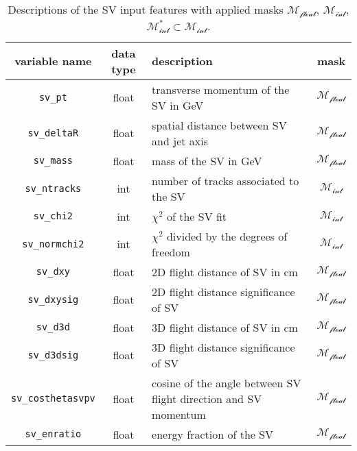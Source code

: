 \begin{table}[h]
\centering
\caption{Descriptions of the SV input features with applied masks $\mathcal{M_{\text{float}}}$, $\mathcal{M_{\text{int}}}$, $\mathcal{M_{\text{int}}^*\subset M_{\text{int}}}$.}
\begin{tabularx}{\textwidth}{|c|c|X|c|}
\hline
\textbf{variable name} & \textbf{data type} & \textbf{description} & \textbf{mask} \\
\hline
\texttt{sv\_pt} & float & transverse momentum of the SV in GeV & \cellcolor{green!50}$\mathcal{M_{\text{float}}}$ \\
\hline
\texttt{sv\_deltaR} & float & spatial distance between SV and jet axis & \cellcolor{green!50}$\mathcal{M_{\text{float}}}$ \\
\hline
\texttt{sv\_mass} & float & mass of the SV in GeV & \cellcolor{green!50}$\mathcal{M_{\text{float}}}$ \\
\hline
\texttt{sv\_ntracks} & int & number of tracks associated to the SV & \cellcolor{red!50}$\mathcal{M_{\text{int}}}$ \\
\hline
\texttt{sv\_chi2} & int & \( \chi^2 \) of the SV fit & \cellcolor{red!50}$\mathcal{M_{\text{int}}}$ \\
\hline
\texttt{sv\_normchi2} & int & \( \chi^2 \) divided by the degrees of freedom & \cellcolor{red!50}$\mathcal{M_{\text{int}}}$ \\
\hline
\texttt{sv\_dxy} & float & 2D flight distance of SV in cm & \cellcolor{green!50}$\mathcal{M_{\text{float}}}$ \\
\hline
\texttt{sv\_dxysig} & float & 2D flight distance significance of SV & \cellcolor{green!50}$\mathcal{M_{\text{float}}}$ \\
\hline
\texttt{sv\_d3d} & float & 3D flight distance of SV in cm & \cellcolor{green!50}$\mathcal{M_{\text{float}}}$ \\
\hline
\texttt{sv\_d3dsig} & float & 3D flight distance significance of SV & \cellcolor{green!50}$\mathcal{M_{\text{float}}}$ \\
\hline
\texttt{sv\_costhetasvpv} & float & cosine of the angle between SV flight direction and SV momentum & \cellcolor{green!50}$\mathcal{M_{\text{float}}}$ \\
\hline
\texttt{sv\_enratio} & float & energy fraction of the SV & \cellcolor{green!50}$\mathcal{M_{\text{float}}}$ \\
\hline
\end{tabularx}
\label{tab:sv_input_features}
\end{table}
